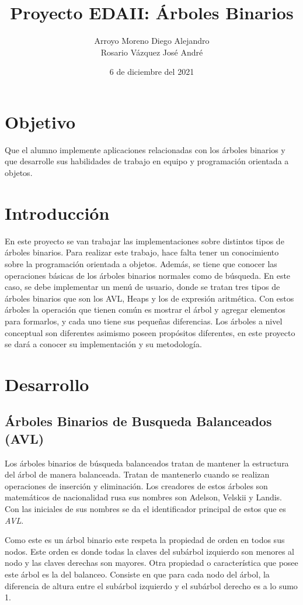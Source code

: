 \documentclass[12pt]{article}
\title{Proyecto EDAII: Árboles Binarios}
\author{Arroyo Moreno Diego Alejandro \\ Rosario Vázquez José André }
\date{6 de diciembre del 2021}
\begin{document}
\maketitle

\section{Objetivo}
Que el alumno implemente aplicaciones relacionadas con los árboles binarios y que desarrolle sus habilidades de trabajo en equipo y programación orientada a objetos.

\section{Introducción}
En este proyecto se van trabajar las implementaciones sobre distintos tipos de árboles binarios. Para realizar este trabajo, hace falta tener un conocimiento sobre la programación orientada a objetos. Además, se tiene que conocer las operaciones básicas de los árboles binarios  normales como de búsqueda. En este caso, se debe implementar un menú de usuario, donde se tratan tres tipos de árboles binarios que son los AVL, Heaps y los de expresión aritmética. Con estos árboles la operación que tienen común es mostrar el árbol y agregar elementos para formarlos, y cada uno tiene sus pequeñas diferencias. Los árboles a nivel conceptual son diferentes asimismo poseen propósitos diferentes, en este proyecto se dará a conocer su implementación y su metodología.

\section{Desarrollo}
\subsection{Árboles Binarios de Busqueda Balanceados (AVL)}
Los árboles binarios de búsqueda balanceados tratan de mantener la estructura del árbol de manera balanceada. Tratan de mantenerlo cuando se realizan operaciones de inserción y eliminación. Los creadores de estos árboles son matemáticos de nacionalidad rusa sus nombres son Adelson, Velskii y Landis. Con las iniciales de sus nombres se da el identificador principal de estos que es \textit{AVL}.

Como este es un árbol binario este respeta la propiedad de orden en todos sus nodos. Este orden es donde todas la claves del subárbol izquierdo son menores  al nodo y las claves derechas son mayores. Otra propiedad o característica que posee este árbol es la del balanceo. Consiste en que para cada nodo del árbol, la diferencia de altura entre el subárbol izquierdo y el subárbol derecho es a lo sumo 1.
\end{document}
